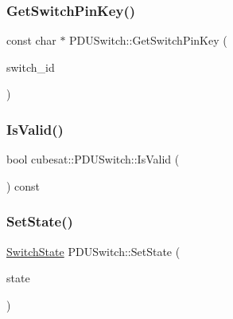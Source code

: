 \mbox{\label{classcubesat_1_1PDUSwitch_a09632cb39b09610b088e3865517d3e4b}} 
\subsubsection{\texorpdfstring{Get\+Switch\+Pin\+Key()}{GetSwitchPinKey()}}
{\footnotesize\ttfamily const char $\ast$ P\+D\+U\+Switch\+::\+Get\+Switch\+Pin\+Key (\begin{DoxyParamCaption}\item[{\hyperlink{namespacecubesat_a4343cdc3d5f03bad7a16bac6c47cd1ca}{Switch\+ID}}]{switch\+\_\+id }\end{DoxyParamCaption})\hspace{0.3cm}{\ttfamily [static]}}

\mbox{\label{classcubesat_1_1PDUSwitch_a4312e39a47e11819759e0b0c2d4ab9fe}} 
\subsubsection{\texorpdfstring{Is\+Valid()}{IsValid()}}
{\footnotesize\ttfamily bool cubesat\+::\+P\+D\+U\+Switch\+::\+Is\+Valid (\begin{DoxyParamCaption}{ }\end{DoxyParamCaption}) const\hspace{0.3cm}{\ttfamily [inline]}}

\mbox{\label{classcubesat_1_1PDUSwitch_aca5fd10f2f780e96a5f3cd8601cb21d5}} 
\subsubsection{\texorpdfstring{Set\+State()}{SetState()}}
{\footnotesize\ttfamily \hyperlink{namespacecubesat_a61ab3c9f315851c6eaaf5ad28f97f2e3}{Switch\+State} P\+D\+U\+Switch\+::\+Set\+State (\begin{DoxyParamCaption}\item[{\hyperlink{namespacecubesat_a61ab3c9f315851c6eaaf5ad28f97f2e3}{Switch\+State}}]{state }\end{DoxyParamCaption})}



